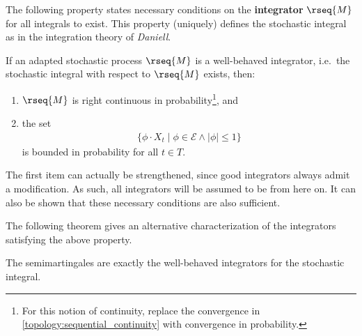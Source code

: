     The following property states necessary conditions on the \textbf{integrator} $\rseq{M}$ for all integrals to exist. This property (uniquely) defines the stochastic integral as in the integration theory of \textit{Daniell}.
    \begin{property}
        If an adapted stochastic process $\rseq{M}$ is a well-behaved integrator, i.e.~the stochastic integral with respect to $\rseq{M}$ exists, then:
        \begin{enumerate}
            \item $\rseq{M}$ is right continuous in probability\footnote{For this notion of continuity, replace the convergence in \cref{topology:sequential_continuity} with convergence in probability.}, and
            \item the set
            \begin{gather}
                \label{stoch:bounded_elementary_set}
                \{\phi\cdot X_t\mid \phi\in\mathcal{E}\land|\phi|\leq1\}
            \end{gather}
            is bounded in probability for all $t\in T$.
        \end{enumerate}
    \end{property}
    The first item can actually be strengthened, since good integrators always admit a \cdlg modification. As such, all integrators will be assumed to be \cdlg from here on. It can also be shown that these necessary conditions are also sufficient.

    The following theorem gives an alternative characterization of the integrators satisfying the above property.
    \begin{theorem}
        The semimartingales are exactly the well-behaved integrators for the stochastic integral.
    \end{theorem}

